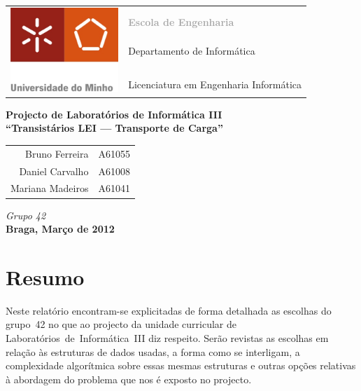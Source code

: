 \documentclass[a5paper,twocolumn, 11pt]{article}
\begin{document}
\onecolumn
\thispagestyle{empty}
\begin{tabular}{ll}
    \multirow{7}{*}{ \includegraphics[height=90pt]{logo.jpeg} }
    &\\
    & \textcolor{DarkGray}{\Large{\textbf{Escola de Engenharia}}} \\
    &\\
    & \large{Departamento de Informática}\\
    &\\
    &\\
    & \large{Licenciatura em Engenharia Informática}\\
\end{tabular}
\begin{center}
    \Large{\textbf{Projecto de Laboratórios de Informática III}}\\
    \vspace{20pt}
    \Large{\textbf{``Transistários LEI --- Transporte de Carga''}}\\
    \vspace{15pt}
    \begin{tabular}{r@{, }l}
        Bruno Ferreira&A61055\\
        Daniel Carvalho&A61008\\
        Mariana Madeiros&A61041\\
    \end{tabular}
    
    \vspace{5pt}
    \emph{Grupo 42}\\\vspace{15pt}
    \large{\textbf{Braga, Março de 2012}}
\end{center}

\newpage
\twocolumn
\tableofcontents
\newpage
\listoffigures

\newpage
\section{Resumo}
Neste relatório encontram-se explicitadas de forma detalhada as escolhas do \mbox{grupo 42} no que ao projecto da unidade curricular de \mbox{Laboratórios de Informática III} diz respeito. Serão revistas as escolhas em relação às estruturas de dados usadas, a forma como se interligam, a complexidade algorítmica sobre essas mesmas estruturas e outras opções relativas à abordagem do problema que nos é exposto no projecto.
\end{document}
